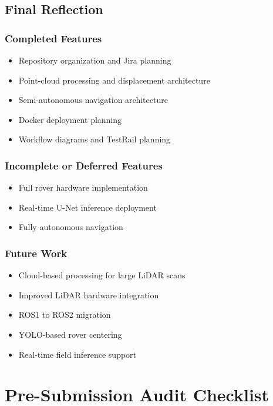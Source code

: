 \documentclass[11pt]{article}
\begin{document}
\subsection{Final Reflection}

\subsubsection*{Completed Features}

\begin{itemize}[leftmargin=*]
  \item Repository organization and Jira planning
  \item Point-cloud processing and displacement architecture
  \item Semi-autonomous navigation architecture
  \item Docker deployment planning
  \item Workflow diagrams and TestRail planning
\end{itemize}

\subsubsection*{Incomplete or Deferred Features}

\begin{itemize}[leftmargin=*]
  \item Full rover hardware implementation
  \item Real-time U-Net inference deployment
  \item Fully autonomous navigation
\end{itemize}

\subsubsection*{Future Work}

\begin{itemize}[leftmargin=*]
  \item Cloud-based processing for large LiDAR scans
  \item Improved LiDAR hardware integration
  \item ROS1 to ROS2 migration
  \item YOLO-based rover centering
  \item Real-time field inference support
\end{itemize}

\section{Pre-Submission Audit Checklist}
\end{document}
